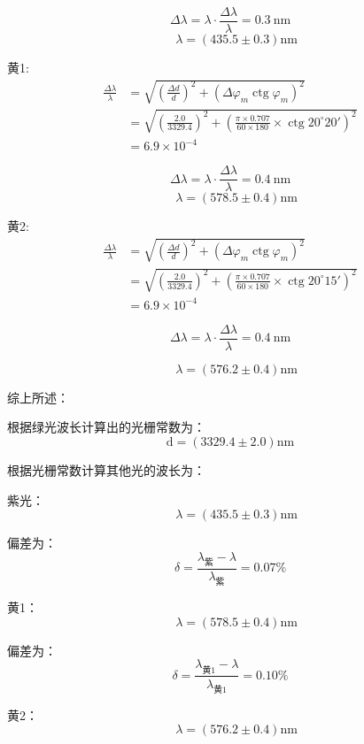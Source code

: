 \documentclass[UTF8]{ctexart}
\begin{document}
   
   $$ 
   \Delta \lambda=\lambda \cdot \frac{\Delta \lambda}{\lambda} = 0.3 \mathrm{~nm} 
   $$
   $$
   \quad \lambda=(435.5 \pm 0.3) \mathrm{nm} 
   $$

   黄1: 
   \begin{align}
    \frac{\Delta \lambda}{\lambda}&=\sqrt{\left(\frac{\Delta d}{d}\right)^{2}+\left(\Delta \varphi_{m} \operatorname{ctg} \varphi_{m}\right)^{2}}  \nonumber \\
    & = \sqrt{\left(\frac{2.0}{3329.4}\right)^{2}+\left(\frac{\pi \times 0.707}{60 \times 180} \times \operatorname{ctg} 20^{\circ}20'\right)^{2}} \nonumber \\
    & = 6.9 \times 10^{-4} \nonumber
   \end{align}

   
   $$ 
   \Delta \lambda=\lambda \cdot \frac{\Delta \lambda}{\lambda} = 0.4 \mathrm{~nm} 
   $$
   $$
   \quad \lambda=(578.5 \pm 0.4) \mathrm{nm} 
   $$

   黄2: 
   \begin{align}
    \frac{\Delta \lambda}{\lambda}&=\sqrt{\left(\frac{\Delta d}{d}\right)^{2}+\left(\Delta \varphi_{m} \operatorname{ctg} \varphi_{m}\right)^{2}}  \nonumber \\
    & = \sqrt{\left(\frac{2.0}{3329.4}\right)^{2}+\left(\frac{\pi \times 0.707}{60 \times 180} \times \operatorname{ctg} 20^{\circ}15'\right)^{2}} \nonumber \\
    & = 6.9 \times 10^{-4} \nonumber
   \end{align}

   $$ 
   \Delta \lambda=\lambda \cdot \frac{\Delta \lambda}{\lambda} = 0.4 \mathrm{~nm} 
   $$

   $$
   \quad \lambda=(576.2 \pm 0.4) \mathrm{nm} 
   $$

\noindent 综上所述：

根据绿光波长计算出的光栅常数为：
$$
  \mathrm{d}=(3329.4 \pm 2.0) \mathrm{nm}
$$
  
根据光栅常数计算其他光的波长为：

紫光：
$$
\quad \lambda=(435.5 \pm 0.3) \mathrm{nm} 
$$

偏差为：
$$
\delta = \frac{\lambda_{\mbox{紫}}-\lambda}{\lambda_{\mbox{紫}}}=0.07\%
$$

黄1：
$$
\quad \lambda=(578.5 \pm 0.4) \mathrm{nm} 
$$

偏差为：
$$
\delta = \frac{\lambda_{\mbox{黄1}}-\lambda}{\lambda_{\mbox{黄1}}}=0.10\%
$$


黄2：
   $$
   \quad \lambda=(576.2 \pm 0.4) \mathrm{nm} 
   $$
\end{document}
